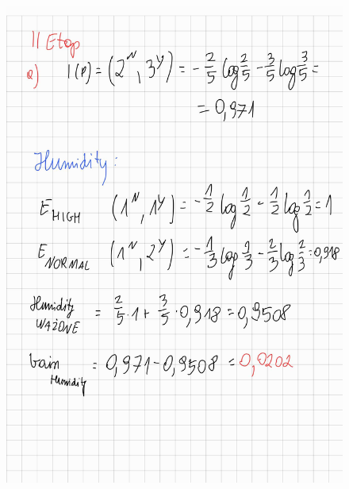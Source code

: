 \documentclass{article}
\begin{document}
\begin{figure}[H]
    \centering
    \includegraphics[width=\textwidth]{tree4.jpg}
\end{figure}
\end{document}
